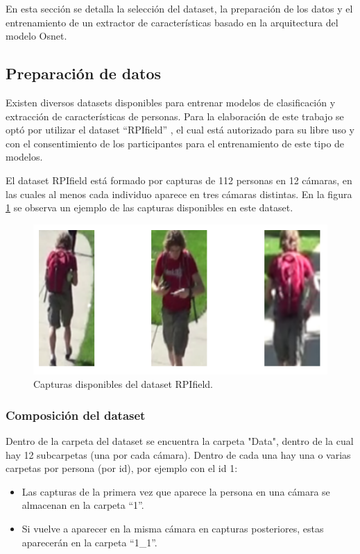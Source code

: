 En esta sección se detalla la selección del dataset, la preparación de los datos y el entrenamiento de un extractor de características basado en la arquitectura del modelo Osnet.

\subsection{Preparación de datos}

Existen diversos datasets disponibles \citep{DATASETS} para entrenar modelos de clasificación y extracción de características de personas. Para la elaboración de este trabajo se optó por utilizar el dataset ``RPIfield'' \citep{RPIfield}, el cual está autorizado para su libre uso y con el consentimiento de los participantes para el entrenamiento de este tipo de modelos.

El dataset RPIfield está formado por capturas de 112 personas en 12 cámaras, en las cuales al menos cada individuo aparece en tres cámaras distintas. En la figura \ref{fig:capturasDataset} se observa un ejemplo de las capturas disponibles en este dataset.

\begin{figure}[ht]
	\centering
	\includegraphics[scale=.70]{./Figures/capturasDataset.png}
	\caption{Capturas disponibles del dataset RPIfield.}
	\label{fig:capturasDataset}
\end{figure}

\subsubsection{Composición del dataset}

Dentro de la carpeta del dataset se encuentra la carpeta "Data", dentro de la cual hay 12 subcarpetas (una por cada cámara). Dentro de cada una hay una o varias carpetas por persona (por id), por ejemplo con el id 1:
\begin{itemize}
\item Las capturas de la primera vez que aparece la persona en una cámara se almacenan en la carpeta ``1''.
\item Si vuelve a aparecer en la misma cámara en capturas posteriores, estas aparecerán en la carpeta ``1\_1''.
\end{itemize}


